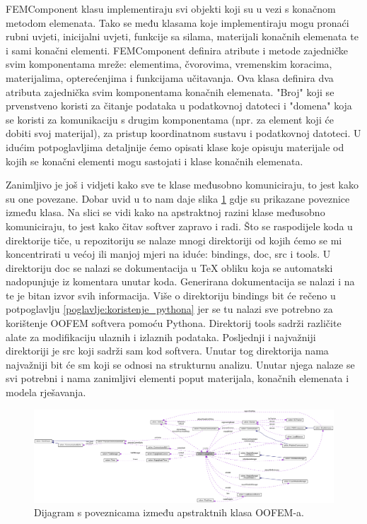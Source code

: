 \documentclass[a4paper,twoside,12pt]{memoir} %
\begin{document}
FEMComponent klasu implementiraju svi objekti koji su u vezi s konačnom metodom elemenata. Tako se među klasama koje implementiraju mogu pronaći rubni uvjeti, inicijalni uvjeti, funkcije sa silama, materijali konačnih elemenata te i sami konačni elementi. FEMComponent definira atribute i metode zajedničke svim komponentama mreže: elementima, čvorovima, vremenskim koracima, materijalima, opterećenjima i funkcijama učitavanja. Ova klasa definira dva atributa zajednička svim komponentama konačnih elemenata. "Broj" koji se prvenstveno koristi za čitanje podataka u podatkovnoj datoteci i "domena" koja se koristi za komunikaciju s drugim komponentama (npr. za element koji će dobiti svoj materijal), za pristup koordinatnom sustavu i podatkovnoj datoteci. U idućim potpoglavljima detaljnije ćemo opisati klase koje opisuju materijale od kojih se konačni elementi mogu sastojati i klase konačnih elemenata. \par

Zanimljivo je još i vidjeti kako sve te klase međusobno komuniciraju, to jest kako su one povezane. Dobar uvid u to nam daje slika \ref{fig:EngngModel_connections} gdje su prikazane poveznice između klasa. Na slici se vidi kako na apstraktnoj razini klase međusobno komuniciraju, to jest kako čitav softver zapravo i radi. Što se raspodijele koda u direktorije tiče, u repozitoriju \cite{oofem_github} se nalaze mnogi direktoriji od kojih ćemo se mi koncentrirati u većoj ili manjoj mjeri na iduće: bindings, doc, src i tools. U direktoriju doc se nalazi se dokumentacija u TeX obliku koja se automatski nadopunjuje iz komentara unutar koda. Generirana dokumentacija se nalazi i na \cite{oofem-web} te je bitan izvor svih informacija. Više o direktoriju bindings bit će rečeno u potpoglavlju \ref{poglavlje:koristenje_pythona} jer se tu nalazi sve potrebno za korištenje OOFEM softvera pomoću Pythona. Direktorij tools sadrži različite alate za modifikaciju ulaznih i izlaznih podataka. Posljednji i najvažniji direktoriji je src koji sadrži sam kod softvera. Unutar tog direktorija nama najvažniji bit će sm koji se odnosi na strukturnu analizu. Unutar njega nalaze se svi potrebni i nama zanimljivi elementi poput materijala, konačnih elemenata i modela rješavanja.

\begin{figure}[h!t]
\begin{center}
\includegraphics[scale=0.2, angle=90]{pictures/chapter_oofem/EngngModel_connections.png}
\caption{Dijagram s poveznicama između apstraktnih klasa OOFEM-a. \cite{oofem_reference}}
\label{fig:EngngModel_connections}
\end{center}
\end{figure}
\end{document}
